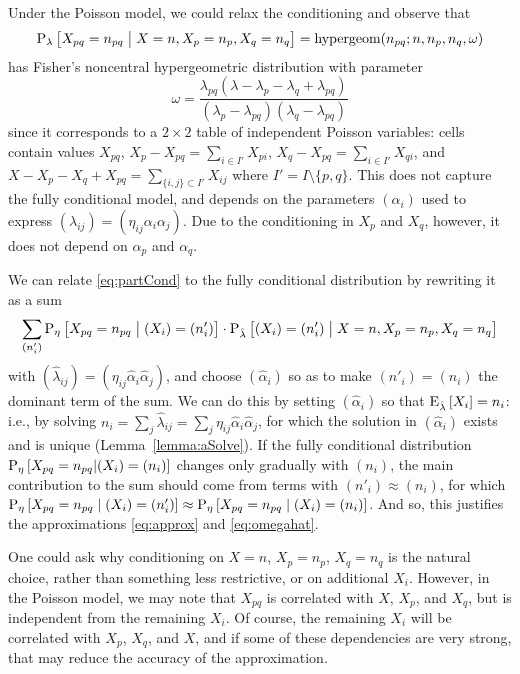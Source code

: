 \documentclass{myaptpub}%
\newcommand\inpair[1]{\subset #1}
\newcommand\Prob{\sP}
\newcommand\ProbSub[1]{#1}
\newcommand\ProbDist[1]{\Prob_{\ProbSub{#1}}}
\newcommand\Prs[2]{\ProbDist{#1}\left[#2\right]}%
\newcommand\Exps[2]{\sE_{#1}\left[#2\right]}
\newcommand\bigmid{\bigm|}
\begin{document}
Under the Poisson model, we could relax the conditioning and observe that
\begin{equation}\label{eq:partCond}
\Prs{\lambda}{X_{pq}=n_{pq}\bigmid X=n, X_p=n_p, X_q=n_q}=\textrm{hypergeom}(n_{pq};n,n_p,n_q,\omega)
\end{equation}
has Fisher's noncentral hypergeometric distribution with parameter
\begin{equation}\nonumber
\omega=\frac{\lambda_{pq}(\lambda-\lambda_p-\lambda_q+\lambda_{pq})}{(\lambda_p-\lambda_{pq})(\lambda_q-\lambda_{pq})}
\end{equation}
since it corresponds to a $2\times2$ table of independent Poisson variables: cells contain values $X_{pq}$, $X_p-X_{pq}=\sum_{i\in I'}X_{pi}$, $X_q-X_{pq}=\sum_{i\in I'}X_{qi}$, and $X-X_p-X_q+X_{pq}=\sum_{\{i,j\}\inpair{I'}}X_{ij}$ where $I'=I\setminus\{p,q\}$. This does not capture the fully conditional model, and depends on the parameters $(\alpha_i)$ used to express $(\lambda_{ij})=(\eta_{ij}\alpha_i\alpha_j)$. Due to the conditioning in $X_p$ and $X_q$, however, it does not depend on $\alpha_p$ and $\alpha_q$.

We can relate \eqref{eq:partCond} to the fully conditional distribution by rewriting it as a sum
\begin{equation}\nonumber
\sum_{(n'_i)} \Prs{\eta}{X_{pq}=n_{pq}\bigmid\strut (X_i)=(n'_i)}
 \cdot \Prs{\hat\lambda}{(X_i)=(n'_i)\bigmid X=n, X_p=n_p, X_q=n_q}
\end{equation}
with $(\hat\lambda_{ij})=(\eta_{ij}\hat\alpha_i\hat\alpha_j)$,
and choose $(\hat\alpha_i)$ so as to make $(n'_i)=(n_i)$ the dominant term of the sum. We can do this by setting $(\hat\alpha_i)$ so that $\Exps{\hat\lambda}{X_i}=n_i$: i.e., by solving $n_i=\sum_j \hat\lambda_{ij}=\sum_j \eta_{ij}\hat\alpha_i\hat\alpha_j$, for which the solution in $(\hat\alpha_i)$ exists and is unique (Lemma~\ref{lemma:aSolve}). If the fully conditional distribution $\Prs{\eta}{X_{pq}=n_{pq}|(X_i)=(n_i)}$ changes only gradually with $(n_i)$, the main contribution to the sum should come from terms with $(n'_i)\approx(n_i)$, for which $\Prs{\eta}{X_{pq}=n_{pq}\mid (X_i)=(n'_i)}\approx\Prs{\eta}{X_{pq}=n_{pq}\mid (X_i)=(n_i)}$. And so, this justifies the approximations \eqref{eq:approx} and \eqref{eq:omegahat}.

One could ask why conditioning on $X=n$, $X_p=n_p$, $X_q=n_q$ is the natural choice, rather than something less restrictive, or on additional $X_i$. However, in the Poisson model, we may note that $X_{pq}$ is correlated with $X$, $X_p$, and $X_q$, but is independent from the remaining $X_i$. Of course, the remaining $X_i$ will be correlated with $X_p$, $X_q$, and $X$, and if some of these dependencies are very strong, that may reduce the accuracy of the approximation.
\end{document}
